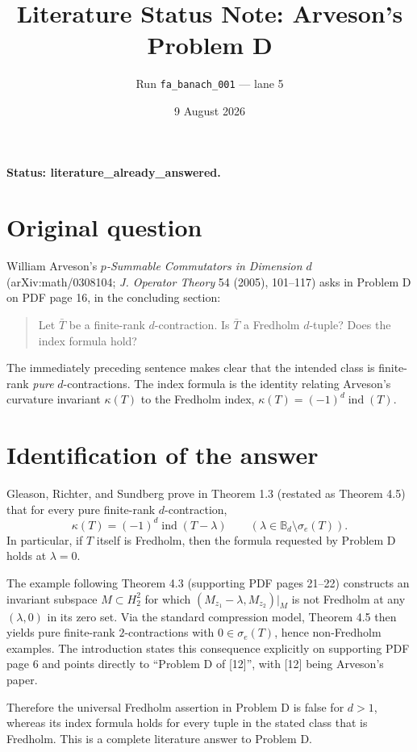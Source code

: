\documentclass[11pt]{article}
\title{Literature Status Note: Arveson's Problem D}
\author{Run \texttt{fa\_banach\_001} --- lane 5}
\date{9 August 2026}
\begin{document}
\maketitle

\textbf{Status: literature\_already\_answered.}

\section*{Original question}
William Arveson's \emph{$p$-Summable Commutators in Dimension $d$}
(arXiv:math/0308104; \emph{J. Operator Theory} 54 (2005), 101--117)
asks in Problem D on PDF page 16, in the concluding section:

\begin{quote}
Let $\bar T$ be a finite-rank $d$-contraction. Is $\bar T$ a Fredholm
$d$-tuple? Does the index formula hold?
\end{quote}

The immediately preceding sentence makes clear that the intended class is
finite-rank \emph{pure} $d$-contractions. The index formula is the identity
relating Arveson's curvature invariant $\kappa(T)$ to the Fredholm index,
$\kappa(T)=(-1)^d\operatorname{ind}(T)$.

\section*{Identification of the answer}
Gleason, Richter, and Sundberg prove in Theorem 1.3 (restated as Theorem 4.5)
that for every pure finite-rank $d$-contraction,
\[
  \kappa(T)=(-1)^d\operatorname{ind}(T-\lambda)
  \qquad(\lambda\in\mathbb B_d\setminus\sigma_e(T)).
\]
In particular, if $T$ itself is Fredholm, then the formula requested by
Problem D holds at $\lambda=0$.

The example following Theorem 4.3 (supporting PDF pages 21--22) constructs an
invariant subspace $M\subset H^2_2$ for which
$(M_{z_1}-\lambda,M_{z_2})|_M$ is not Fredholm at any $(\lambda,0)$ in its
zero set. Via the standard compression model, Theorem 4.5 then yields pure
finite-rank $2$-contractions with $0\in\sigma_e(T)$, hence non-Fredholm
examples. The introduction states this consequence explicitly on supporting
PDF page 6 and points directly to ``Problem D of [12]'', with [12] being
Arveson's paper.

Therefore the universal Fredholm assertion in Problem D is false for $d>1$,
whereas its index formula holds for every tuple in the stated class that is
Fredholm. This is a complete literature answer to Problem D.
\end{document}
